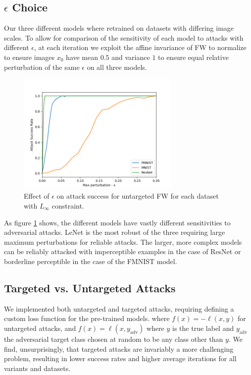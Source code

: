 \documentclass{article}
\begin{document}
\subsection{$\epsilon$ Choice}
Our three different models where retrained on datasets with differing image scales. To allow for comparison of the sensitivity of each model to attacks with different $\epsilon$, at each iteration we exploit the affine invariance of FW to normalize to ensure images $x_0$ have mean $0.5$ and variance $1$ to ensure equal relative perturbation of the same $\epsilon$ on all three models. 

\begin{figure}[H]
    \centering
    \includegraphics[width=0.7\textwidth]{plots/eps_choice.png}
    \caption{Effect of $\epsilon$ on attack success for untargeted FW for each dataset with $L_\infty$ constraint.}
    \label{fig:eps}
\end{figure}

As figure \ref{fig:eps} shows, the different models have vastly different sensitivities to adversarial attacks. LeNet is the most robust of the three requiring large maximum perturbations for reliable attacks. The larger, more complex models can be reliably attacked with imperceptible examples in the case of ResNet or borderline perceptible in the case of the FMNIST model. 

\subsection{Targeted vs. Untargeted Attacks}
We implemented both untargeted and targeted attacks, requiring defining a custom loss function for the pre-trained models. where $f(x) = -\ell(x, y)$ for untargeted attacks, and $f(x) = \ell(x, y_\text{adv})$ where $y$ is the true label and $y_\text{adv}$ the adversarial target class chosen at random to be any class other than $y$. We find, unsurprisingly, that targeted attacks are invariably a more challenging problem, resulting in lower success rates and higher average iterations for all variants and datasets.
\end{document}

